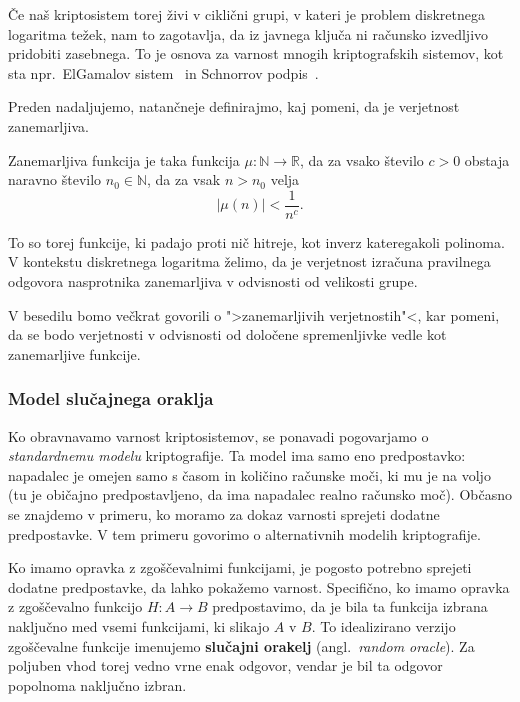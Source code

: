 \documentclass[isrm2, tisk]{fmfdelo}
\newcommand{\R}{\mathbb R}
\newcommand{\N}{\mathbb N}
\begin{document}
Če naš kriptosistem torej živi v ciklični grupi, v kateri je problem diskretnega logaritma težek,
nam to zagotavlja, da iz javnega ključa ni računsko izvedljivo pridobiti zasebnega. To je osnova
za varnost mnogih kriptografskih sistemov, kot sta npr.\ ElGamalov sistem~\cite{elgamal1985elgamal}
in Schnorrov podpis~\cite{schnorr1989sig}.

Preden nadaljujemo, natančneje definirajmo, kaj pomeni, da je verjetnost zanemarljiva.

\begin{definicija}
    Zanemarljiva funkcija je taka funkcija $\mu : \N \rightarrow \R$, da za vsako število
    $c > 0$ obstaja naravno število $n_0 \in \N$, da za vsak $n > n_0$ velja
    $$
    |\mu(n)| < \frac{1}{n^c}.
    $$
\end{definicija}

To so torej funkcije, ki padajo proti nič hitreje, kot inverz kateregakoli polinoma. V kontekstu
diskretnega logaritma želimo, da je verjetnost izračuna pravilnega odgovora nasprotnika zanemarljiva
v odvisnosti od velikosti grupe.

V besedilu bomo večkrat govorili o ">zanemarljivih verjetnostih"<, kar pomeni, da se bodo
verjetnosti v odvisnosti od določene spremenljivke vedle kot zanemarljive funkcije.

\subsubsection{Model slučajnega oraklja}
Ko obravnavamo varnost kriptosistemov, se ponavadi pogovarjamo o \textit{standardnemu modelu} kriptografije. 
Ta model ima samo eno predpostavko: napadalec je omejen samo s časom in količino računske moči, ki mu 
je na voljo (tu je običajno predpostavljeno, da ima napadalec realno računsko moč). Občasno se znajdemo 
v primeru, ko moramo za dokaz varnosti sprejeti dodatne predpostavke. V tem primeru govorimo o 
alternativnih modelih kriptografije. 

Ko imamo opravka z zgoščevalnimi funkcijami, je pogosto potrebno sprejeti dodatne predpostavke, da lahko 
pokažemo varnost. Specifično, ko imamo opravka z zgoščevalno funkcijo $H: A \rightarrow B$ predpostavimo, 
da je bila ta funkcija izbrana naključno med vsemi funkcijami, ki slikajo $A$ v $B$. To idealizirano 
verzijo zgoščevalne funkcije imenujemo \textbf{slučajni orakelj} (angl.\ \textit{random oracle}).
Za poljuben vhod torej vedno vrne enak odgovor, vendar je bil ta odgovor popolnoma naključno izbran.
\end{document}
